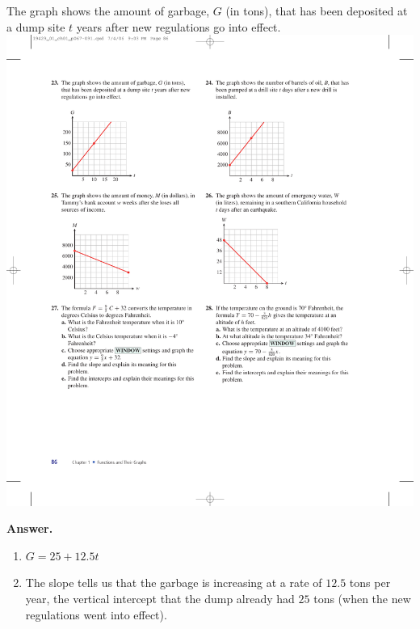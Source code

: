 \documentclass[10pt,]{book}
\theoremstyle{plain}
\theoremstyle{definition}
\theoremstyle{definition}
\theoremstyle{definition}
\theoremstyle{definition}
\numberwithin{equation}{part}
\begin{document}
\begin{exerciselist}
\begin{exercisegroup}
%
\exercise[23.]\hypertarget{exercise-309}{}The graph shows the amount of garbage, \(G\) (in tons), that has been deposited at a dump site \(t\) years after new regulations go into effect. \includegraphics[width=0.8\linewidth]{images/fig-ex-1-5-23}
%
\par\smallskip
\noindent\textbf{Answer.}\hypertarget{answer-175}{}\quad
\leavevmode%
\begin{enumerate}[label=*\alph**]
\item\hypertarget{li-1172}{}\(G = 25 + 12.5t\)%
\item\hypertarget{li-1173}{}The slope tells us that the garbage is increasing at a rate of \(12.5\) tons per year, the vertical intercept that the dump already had \(25\) tons (when the new regulations went into effect).%
\end{enumerate}
%

\end{exercisegroup}
\end{exerciselist}
\end{document}
